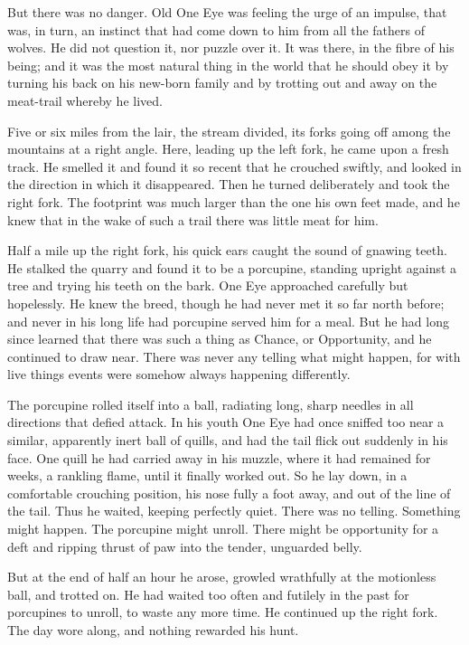 \documentclass[10pt]{book}
\begin{document}
But there was no danger. Old One Eye was feeling the urge of an
impulse, that was, in turn, an instinct that had come down to him from
all the fathers of wolves. He did not question it, nor puzzle over it.
It was there, in the fibre of his being; and it was the most natural
thing in the world that he should obey it by turning his back on his
new-born family and by trotting out and away on the meat-trail whereby
he lived.

Five or six miles from the lair, the stream divided, its forks going
off among the mountains at a right angle. Here, leading up the left
fork, he came upon a fresh track. He smelled it and found it so recent
that he crouched swiftly, and looked in the direction in which it
disappeared. Then he turned deliberately and took the right fork. The
footprint was much larger than the one his own feet made, and he knew
that in the wake of such a trail there was little meat for him.

Half a mile up the right fork, his quick ears caught the sound of
gnawing teeth. He stalked the quarry and found it to be a porcupine,
standing upright against a tree and trying his teeth on the bark. One
Eye approached carefully but hopelessly. He knew the breed, though he
had never met it so far north before; and never in his long life had
porcupine served him for a meal. But he had long since learned that
there was such a thing as Chance, or Opportunity, and he continued to
draw near. There was never any telling what might happen, for with live
things events were somehow always happening differently.

The porcupine rolled itself into a ball, radiating long, sharp needles
in all directions that defied attack. In his youth One Eye had once
sniffed too near a similar, apparently inert ball of quills, and had
the tail flick out suddenly in his face. One quill he had carried away
in his muzzle, where it had remained for weeks, a rankling flame, until
it finally worked out. So he lay down, in a comfortable crouching
position, his nose fully a foot away, and out of the line of the tail.
Thus he waited, keeping perfectly quiet. There was no telling.
Something might happen. The porcupine might unroll. There might be
opportunity for a deft and ripping thrust of paw into the tender,
unguarded belly.

But at the end of half an hour he arose, growled wrathfully at the
motionless ball, and trotted on. He had waited too often and futilely
in the past for porcupines to unroll, to waste any more time. He
continued up the right fork. The day wore along, and nothing rewarded
his hunt.
\end{document}
